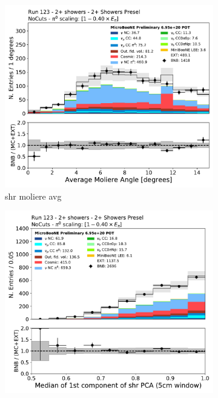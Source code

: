 \begin{figure}[H]
    \centering
    \begin{subfigure}{0.3\textwidth}
    \includegraphics[width=1.0\textwidth]{Sidebands/Figures/TwoShr_1e0pSel/Presel/shrmoliereavg.pdf}
    \caption{shr moliere avg}
    \end{subfigure}
    \begin{subfigure}{0.3\textwidth}
    \includegraphics[width=1.0\textwidth]{Sidebands/Figures/TwoShr_1e0pSel/Presel/shrPCA1CMed_5cm.pdf}

\end{subfigure}
\end{figure}
